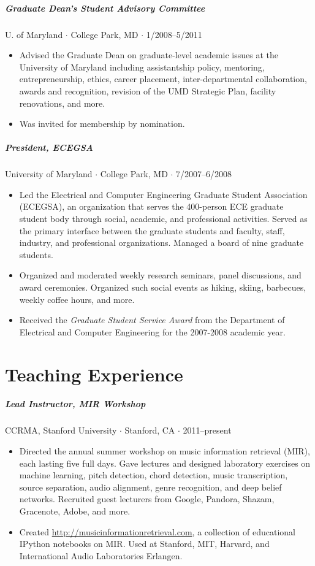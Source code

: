 \documentclass[10pt,letterpaper]{article}
\begin{document}
\subparagraph{Graduate Dean's Student Advisory Committee}
U. of Maryland $\cdot$ College Park, MD $\cdot$ 1/2008--5/2011
\begin{itemize}
    \item Advised the Graduate Dean on graduate-level academic issues at the University of Maryland including assistantship policy, mentoring, entrepreneurship, ethics, career placement, inter-departmental collaboration, awards and recognition, revision of the UMD Strategic Plan, facility renovations, and more.
    \item Was invited for membership by nomination.
\end{itemize}

\subparagraph{President, ECEGSA}
University of Maryland $\cdot$ College Park, MD $\cdot$ 7/2007--6/2008
\begin{itemize}
    \item Led the Electrical and Computer Engineering Graduate Student Association (ECEGSA), an organization that serves the 400-person ECE graduate student body through social, academic, and professional activities.  Served as the primary interface between the graduate students and faculty, staff, industry, and professional organizations.  Managed a board of nine graduate students. 
    \item Organized and moderated weekly research seminars, panel discussions, and award ceremonies.  Organized such social events as hiking, skiing, barbecues, weekly coffee hours, and more.
    \item Received the \textit{Graduate Student Service Award} from the Department of Electrical and Computer Engineering for the 2007-2008 academic year.
\end{itemize}


\section*{Teaching Experience}

\subparagraph{Lead Instructor, MIR Workshop} CCRMA, Stanford University $\cdot$ Stanford, CA $\cdot$ 2011--present
\begin{itemize}
    \item Directed the annual summer workshop on music information retrieval (MIR), each lasting five full days.  Gave lectures and designed laboratory exercises on machine learning, pitch detection, chord detection, music transcription, source separation, audio alignment, genre recognition, and deep belief networks. Recruited guest lecturers from Google, Pandora, Shazam, Gracenote, Adobe, and more.
    \item Created \url{http://musicinformationretrieval.com}, a collection of educational IPython notebooks on MIR. Used at Stanford, MIT, Harvard, and International Audio Laboratories Erlangen.
\end{itemize}
\end{document}
